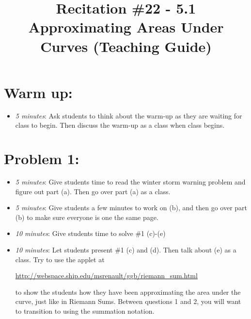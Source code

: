 \documentclass[handout,nooutcomes]{ximera}
\title{Recitation \#22 - 5.1 Approximating Areas Under Curves (Teaching Guide)}
\begin{document}
\begin{abstract}		\end{abstract}
\maketitle


\section*{Warm up:} 
	
	\begin{itemize}
	
	\item  \emph{5 minutes}:  Ask students to think about the warm-up as they are waiting for class to begin.  Then discuss the warm-up as a class when class begins.
	
	
	
	\end{itemize}


\section*{Problem 1:}

	\begin{itemize}
	
	\item  \emph{5 minutes}:  Give students time to read the winter storm warning problem and figure out part (a).  Then go over part (a) as a class.
	
	\item  \emph{5 minutes}:  Give students a few minutes to work on (b), and then go over part (b) to make sure everyone is one the same page.
	
	\item  \emph{10 minutes}:  Give students time to solve \#1 (c)-(e)
	
	\item  \emph{10 minutes}:  Let students present \#1 (c) and (d).  Then talk about (e) as a class.  Try to use the applet at
	
	 \url{http://webspace.ship.edu/msrenault/ggb/riemann_sum.html}
	  
	  to show the students how they have been approximating the area under the curve, just like in Riemann Sums.  Between questions 1 and 2, you will want to transition to using the summation notation.
	
	\end{itemize}
\end{document}

